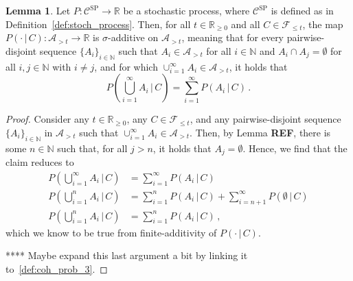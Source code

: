 \documentclass[10pt]{paper}
\theoremstyle{definition}
\newtheorem{lemma}[theorem]{Lemma}
\newcommand{\nats}{\mathbb{N}}
\newcommand{\reals}{\mathbb{R}}
\newcommand{\realsnonneg}{\reals_{\geq 0}}
\begin{document}
\begin{lemma}\label{lem:stoch_process_sigma_add_on_algebra}
Let $P:\mathcal{C}^{\mathrm{SP}}\to\reals$ be a stochastic process, where $\mathcal{C}^{\mathrm{SP}}$ is defined as in Definition~\ref{def:stoch_process}. Then, for all $t\in\realsnonneg$ and all $C\in\mathcal{F}_{\leq t}$, the map $P(\cdot\,\vert\,C):\mathcal{A}_{>t}\to\reals$ is $\sigma$-additive on $\mathcal{A}_{>t}$, meaning that for every pairwise-disjoint sequence $\{A_i\}_{i\in\nats}$ such that $A_i\in\mathcal{A}_{>t}$ for all $i\in\nats$ and $A_i\cap A_j=\emptyset$ for all $i,j\in\nats$ with $i\neq j$, and for which $\cup_{i=1}^\infty A_i\in\mathcal{A}_{>t}$, it holds that
\begin{equation*}
P\left(\bigcup_{i=1}^\infty A_i\,\Big\vert\,C\right) = \sum_{i=1}^\infty P(A_i\,\vert\,C)\,.
\end{equation*}
\end{lemma}
\begin{proof}
Consider any $t\in\realsnonneg$, any $C\in\mathcal{F}_{\leq t}$, and any pairwise-disjoint sequence $\{A_i\}_{i\in\nats}$ in $\mathcal{A}_{>t}$ such that $\cup_{i=1}^\infty A_i\in\mathcal{A}_{>t}$. Then, by Lemma {\bf REF}, there is some $n\in\nats$ such that, for all $j>n$, it holds that $A_j=\emptyset$. Hence, we find that the claim reduces to
\begin{align*}
P\left(\bigcup_{i=1}^\infty A_i\,\Big\vert\,C\right) &= \sum_{i=1}^\infty P(A_i\,\vert\,C) \\
P\left(\bigcup_{i=1}^n A_i\,\Big\vert\,C\right) &= \sum_{i=1}^n P(A_i\,\vert\,C) + \sum_{i=n+1}^\infty P(\emptyset\,\vert\,C) \\
P\left(\bigcup_{i=1}^n A_i\,\Big\vert\,C\right) &= \sum_{i=1}^n P(A_i\,\vert\,C)\,,
\end{align*}
which we know to be true from finite-additivity of $P(\cdot\,\vert\,C)$.

**** Maybe expand this last argument a bit by linking it to~\ref{def:coh_prob_3}.
\end{proof}
\end{document}
